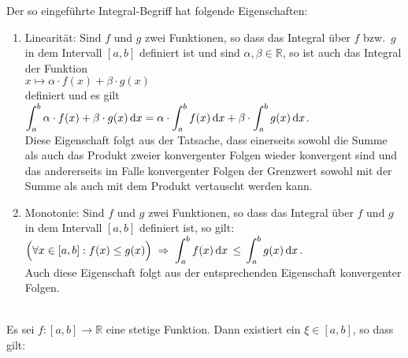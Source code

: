 \noindent
Der so eingef\"uhrte Integral-Begriff hat folgende Eigenschaften:
\begin{enumerate}
\item Linearit\"at: Sind $f$ und $g$ zwei Funktionen, so dass
      das Integral \"uber $f$ bzw.~$g$ in dem Inter\-vall $[a,b]$ definiert ist
      und sind $\alpha,\beta \in\mathbb{R}$,
      so ist auch das Integral der Funktion
      \\[0.2cm]
      \hspace*{1.3cm} $x \mapsto \alpha\cdot f(x) + \beta\cdot g(x)$ \\[0.2cm]
      definiert und es gilt 
      \\[0.2cm]
      \hspace*{1.3cm}
      $\displaystyle\int_a^b \alpha\cdot f(x) + \beta\cdot g(x)\,\textrm{d} x = \alpha\cdot \int_a^b f(x)\,\textrm{d} x + \beta\cdot \int_a^b g(x)\,\textrm{d} x$.
      \\[0.2cm]
      Diese Eigenschaft folgt aus der Tatsache, dass einerseits sowohl die Summe als auch das
      Produkt zweier konvergenter Folgen wieder konvergent sind und das andererseits im Falle
      konvergenter Folgen der Grenzwert sowohl mit der Summe als auch mit dem Produkt vertauscht
      werden kann.
\item Monotonie:  Sind $f$ und $g$ zwei Funktionen, so dass
      das Integral \"uber $f$ und  $g$ in dem Intervall $[a,b]$ definiert ist, so gilt: 
      \\[0.2cm]
      \hspace*{1.3cm}
      $\displaystyle\Bigl(\forall x \in [a,b]: f(x) \leq g(x)\Bigr) \;\Rightarrow\;
       \int_a^b f(x)\, \textrm{d} x \,\leq\, \int_a^b g(x)\, \textrm{d} x$.
      \\[0.2cm] 
      Auch diese Eigenschaft folgt aus der entsprechenden Eigenschaft konvergenter Folgen.
\end{enumerate}


\begin{Satz} \hspace*{\fill} \\
Es sei $f:[a,b] \rightarrow \mathbb{R}$ eine stetige Funktion. Dann existiert ein $\xi \in [a,b]$, so dass gilt:
\\[0.2cm]
\hspace*{1.3cm}
\colorbox{red}{\colorbox{orange}{}}
\end{Satz}

